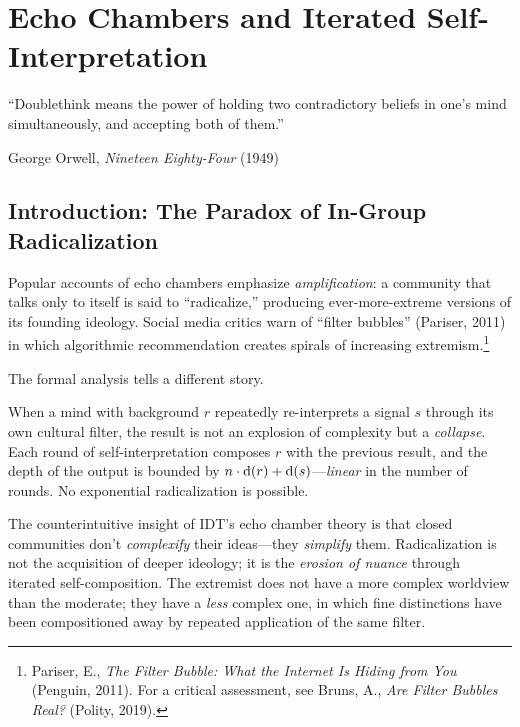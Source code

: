 \chapter{Echo Chambers and Iterated Self-Interpretation}
\label{ch:echo}

\epigraph{%
  ``Doublethink means the power of holding two contradictory beliefs in
  one's mind simultaneously, and accepting both of them.''}%
  {George Orwell, \textit{Nineteen Eighty-Four} (1949)}

\section{Introduction: The Paradox of In-Group Radicalization}
\label{sec:echo-intro}

Popular accounts of echo chambers emphasize \emph{amplification}: a
community that talks only to itself is said to ``radicalize,'' producing
ever-more-extreme versions of its founding ideology.  Social media critics
warn of ``filter bubbles'' (Pariser, 2011) in which algorithmic
recommendation creates spirals of increasing extremism.\footnote{Pariser, E.,
\textit{The Filter Bubble: What the Internet Is Hiding from You} (Penguin,
2011).  For a critical assessment, see Bruns, A., \textit{Are Filter Bubbles
Real?} (Polity, 2019).}

The formal analysis tells a different story.

When a mind with background $r$ repeatedly re-interprets a signal $s$
through its own cultural filter, the result is not an explosion of
complexity but a \emph{collapse}.  Each round of self-interpretation
composes $r$ with the previous result, and the depth of the output is
bounded by $n\cdot\operatorname{d}(r)+\operatorname{d}(s)$---\emph{linear} in the number of
rounds.  No exponential radicalization is possible.

The counterintuitive insight of IDT's echo chamber theory is that closed
communities don't \emph{complexify} their ideas---they \emph{simplify}
them.  Radicalization is not the acquisition of deeper ideology; it is the
\emph{erosion of nuance} through iterated self-composition.  The extremist
does not have a more complex worldview than the moderate; they have a
\emph{less} complex one, in which fine distinctions have been compositioned
away by repeated application of the same filter.

